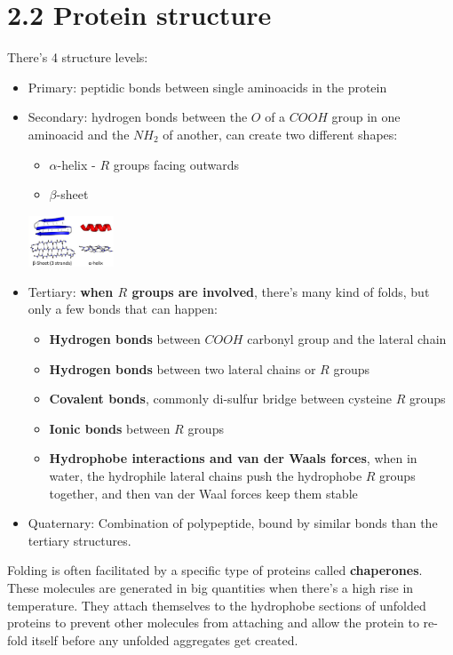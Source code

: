 \documentclass[a4paper,landscape,10pt]{cheatsheet}
\begin{document}
\section*{2.2 Protein structure}
There's 4 structure levels:
\begin{itemize}
  \item Primary: peptidic bonds between single aminoacids in the protein
  \item Secondary: hydrogen bonds between the $O$ of a $COOH$ group in one aminoacid and the $NH_2$ of another, can
        create two different shapes:
        \begin{itemize}
          \item $\alpha$-helix - $R$ groups facing outwards
          \item $\beta$-sheet
        \end{itemize}
        \includegraphics[width=0.2\textwidth]{images/secondary_protein_structure.png}
  \item Tertiary: \textbf{when $R$ groups are involved}, there's many kind of folds, but only a few bonds that can
        happen:
        \begin{itemize}
          \item \textbf{Hydrogen bonds} between $COOH$ carbonyl group and the lateral chain
          \item \textbf{Hydrogen bonds} between two lateral chains or $R$ groups
          \item \textbf{Covalent bonds}, commonly di-sulfur bridge between cysteine $R$ groups
          \item \textbf{Ionic bonds} between $R$ groups
          \item \textbf{Hydrophobe interactions and van der Waals forces}, when in water, the hydrophile lateral chains
                push the hydrophobe $R$ groups together, and then van der Waal forces keep them stable
        \end{itemize}
  \item Quaternary: Combination of polypeptide, bound by similar bonds than the tertiary structures.
\end{itemize}
Folding is often facilitated by a specific type of proteins called \textbf{chaperones}. These molecules are generated in
big quantities when there's a high rise in temperature. They attach themselves to the hydrophobe sections of unfolded
proteins to prevent other molecules from attaching and allow the protein to re-fold itself before any unfolded
aggregates get created.
\end{document}
